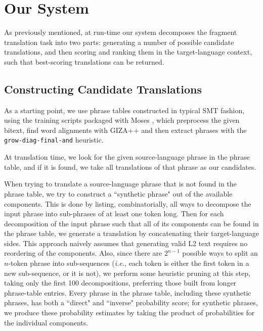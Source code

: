 \documentclass[11pt]{article}
\begin{document}

\section{Our System}
\label{sec:system}

As previously mentioned, at run-time our system decomposes the fragment
translation task into two parts: generating a number of possible candidate
translations, and then scoring and ranking them in the target-language context,
such that best-scoring translations can be returned.

\subsection{Constructing Candidate Translations}
\label{sec:candidates}

As a starting point, we use phrase tables constructed in typical SMT fashion,
using the training scripts packaged with Moses \cite{koehn:hoang:ea:07}, which
preprocess the given bitext, find word alignments with GIZA++ \cite{och:ney:00}
and then extract phrases with the \texttt{grow-diag-final-and} heuristic. 

At translation time, we look for the given source-language phrase in the phrase
table, and if it is found, we take all translations of that phrase as our
candidates.

When trying to translate a source-language phrase that is not found in the
phrase table, we try to construct a ``synthetic phrase" out of the available
components. This is done by listing, combinatorially, all ways to decompose the
input phrase into sub-phrases of at least one token long. Then for each
decomposition of the input phrase such that all of its components can be found
in the phrase table, we generate a translation by concatenating their
target-language sides. This approach naively assumes that generating valid L2
text requires no reordering of the components. Also, since there are $2^{n-1}$
possible ways to split an $n$-token phrase into sub-sequences (\textit{i.e.},
each token is either the first token in a new sub-sequence, or it is not), we
perform some heuristic pruning at this step, taking only the first 100
decompositions, preferring those built from longer phrase-table entries. Every
phrase in the phrase table, including these synthetic phrases, has both a
``direct" and ``inverse" probability score; for synthetic phrases, we produce
these probability estimates by taking the product of probabilities for the
individual components.
\end{document}
